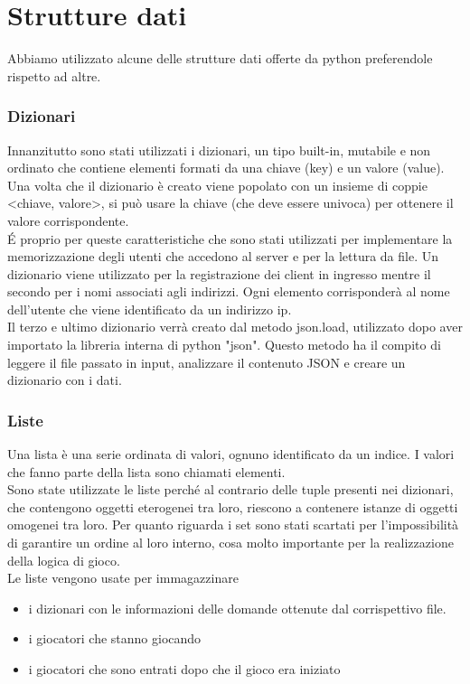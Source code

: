 \documentclass[a4paper,12pt]{report}
\begin{document}
\chapter{Strutture dati}
Abbiamo utilizzato alcune delle strutture dati offerte da python preferendole rispetto ad altre.
\subsection{Dizionari}
Innanzitutto sono stati utilizzati i dizionari, un tipo built-in, mutabile e non ordinato che contiene elementi formati da una chiave (key) e un valore (value). Una volta che il dizionario è creato viene popolato con un insieme di coppie <chiave, valore>, si può usare la chiave (che deve essere univoca) per ottenere il valore corrispondente.\\
É proprio per queste caratteristiche che sono stati utilizzati per implementare la memorizzazione degli utenti che accedono al server e per la lettura da file. Un dizionario viene utilizzato per la registrazione dei client in ingresso mentre il secondo per i nomi associati agli indirizzi. Ogni elemento corrisponderà al nome dell'utente che viene identificato da un indirizzo ip.\\
Il terzo e ultimo dizionario verrà creato dal metodo json.load, utilizzato dopo aver importato la libreria interna di python "json".
Questo metodo ha il compito di leggere il file passato in input, analizzare il contenuto JSON e creare un dizionario con i dati.\clearpage
 
\subsection{Liste} 
Una lista è una serie ordinata di valori, ognuno identificato da un indice. I valori che fanno parte della lista sono chiamati elementi.\\
Sono state utilizzate le liste perché al contrario delle tuple presenti nei dizionari, che contengono oggetti eterogenei tra loro, riescono a contenere istanze di oggetti omogenei tra loro. Per quanto riguarda i set sono stati scartati per l'impossibilità di garantire un ordine al loro interno, cosa molto importante per la realizzazione della logica di gioco.\\
Le liste vengono usate per immagazzinare
\begin{itemize}
	\item i dizionari con le informazioni delle domande ottenute dal corrispettivo file.
	\item i giocatori che stanno giocando 
	\item i giocatori che sono entrati dopo che il gioco era iniziato
\end{itemize}
\end{document}

